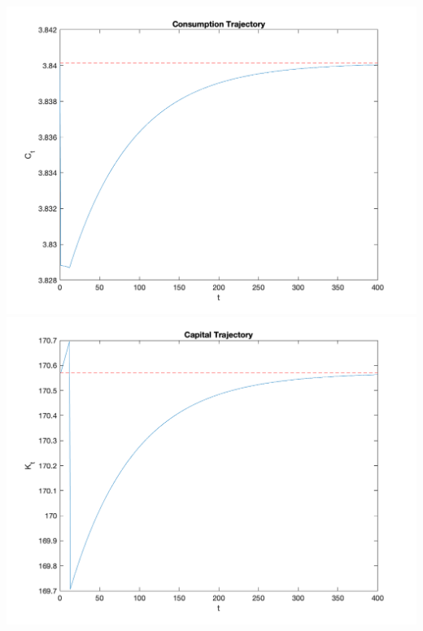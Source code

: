 \documentclass[]{article}
\begin{document}
\includegraphics[scale=.7]{consumption}\\
\includegraphics[scale=.7]{capital}
\end{document}
